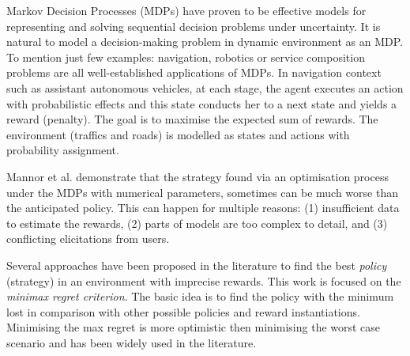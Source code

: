 \documentclass[sigconf]{aamas}  %
\begin{document}
Markov Decision Processes (MDPs) have proven to be effective models for representing and solving sequential decision problems under uncertainty. It is natural to model a decision-making problem in dynamic environment as an MDP. To mention just few examples: navigation, robotics or service composition problems are all well-established applications of MDPs. In navigation context such as assistant autonomous vehicles, at each stage, the agent executes an action with probabilistic effects and this state conducts her to a next state and yields a reward (penalty). The goal is to maximise the expected sum of rewards. The environment %
 (traffics and roads) is modelled as states and actions with probability assignment.%
 
 
Mannor et al.  demonstrate that the strategy found via an optimisation process under the MDPs with numerical parameters, sometimes can be much worse than the anticipated policy. This can happen for multiple reasons:
(1) insufficient data to estimate the rewards,
(2) parts of models are too complex to detail, %
and (3) conflicting elicitations from users. %

Several approaches have been proposed in the literature to find the best \textit{policy} (strategy) in an environment with imprecise rewards. This work is focused on the \textit{minimax regret criterion}. The basic idea is to find the policy with the minimum lost in comparison with other possible policies and reward instantiations. Minimising the max regret is more optimistic then  minimising the worst case scenario and has been widely used in the literature. %
\end{document}
